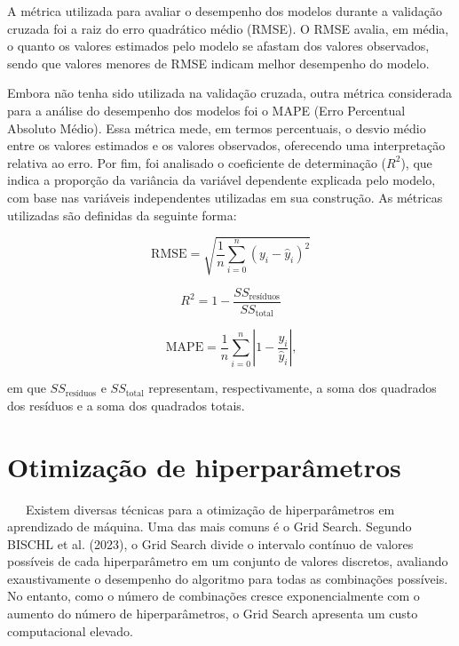 \documentclass[
  12pt,
  a4paper,
]{scrreprt}
\begin{document}
\vspace{12pt}

A métrica utilizada para avaliar o desempenho dos modelos durante a
validação cruzada foi a raiz do erro quadrático médio (RMSE). O RMSE
avalia, em média, o quanto os valores estimados pelo modelo se afastam
dos valores observados, sendo que valores menores de RMSE indicam melhor
desempenho do modelo.

\vspace{12pt}

Embora não tenha sido utilizada na validação cruzada, outra métrica
considerada para a análise do desempenho dos modelos foi o MAPE (Erro
Percentual Absoluto Médio). Essa métrica mede, em termos percentuais, o
desvio médio entre os valores estimados e os valores observados,
oferecendo uma interpretação relativa ao erro. Por fim, foi analisado o
coeficiente de determinação (\(R^2\)), que indica a proporção da
variância da variável dependente explicada pelo modelo, com base nas
variáveis independentes utilizadas em sua construção. As métricas
utilizadas são definidas da seguinte forma:

\begin{figure}

\begin{minipage}{0.33\linewidth}
\[
\text{RMSE} = \sqrt{\dfrac{1}{n} \sum_{i = 0}^n (y_i - \hat y_i)^2}
\]\end{minipage}%
%
\begin{minipage}{0.33\linewidth}
\[
R^2 = 1 - \dfrac{SS_{\text{resíduos}}}{SS_{\text{total}}}
\]\end{minipage}%
%
\begin{minipage}{0.33\linewidth}
\[
\text{MAPE} = \frac{1}{n} \sum_{i=0}^n \left|1 - \frac{y_i}{\hat y_i}\right|\text{,}
\]\end{minipage}%

\end{figure}%

\noindent em que \(SS_{\text{resíduos}}\) e \(SS_{\text{total}}\)
representam, respectivamente, a soma dos quadrados dos resíduos e a soma
dos quadrados totais.

\section{Otimização de
hiperparâmetros}\label{otimizauxe7uxe3o-de-hiperparuxe2metros}

~~~Existem diversas técnicas para a otimização de hiperparâmetros em
aprendizado de máquina. Uma das mais comuns é o Grid Search. Segundo
BISCHL et al. (2023), o Grid Search divide o intervalo contínuo de
valores possíveis de cada hiperparâmetro em um conjunto de valores
discretos, avaliando exaustivamente o desempenho do algoritmo para todas
as combinações possíveis. No entanto, como o número de combinações
cresce exponencialmente com o aumento do número de hiperparâmetros, o
Grid Search apresenta um custo computacional elevado.
\end{document}
